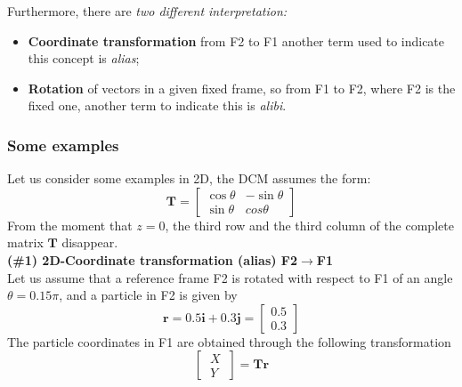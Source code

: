 Furthermore, there are \textit{two different interpretation:}
\begin{itemize}
    \itemsep0em
    \item \textbf{Coordinate transformation} from F2 to F1 another term used to indicate this concept is \textit{alias}; 
    \item \textbf{Rotation} of vectors in a given fixed frame, so from F1 to F2, where F2 is the fixed one, another term to indicate this is \textit{alibi}.
\end{itemize}

\subsubsection*{\color{red} Some examples}
Let us consider some examples in 2D, the DCM assumes the form:
\begin{equation*}
    \mathbf{T} = \begin{bmatrix}
        \cos\theta&-\sin\theta\\
        \sin\theta&cos\theta
    \end{bmatrix}
\end{equation*}
From the moment that $z=0$, the third row and the third column of the complete matrix $\mathbf{T}$ disappear.\\

\noindent
{\color{blue} 
\textbf{(\#1) 2D-Coordinate transformation (alias) F2$\to$F1}
}\\
Let us assume that a reference frame F2 is rotated with respect to F1 of an angle $\theta=0.15\pi$, and a particle in F2 is given by
\begin{equation*}
    \mathbf{r} = 0.5\mathbf{i}+0.3\mathbf{j} =
    \begin{bmatrix}
        0.5\\0.3
    \end{bmatrix}
\end{equation*}
The particle coordinates in F1 are obtained through the following transformation
\begin{equation*}
    \begin{bmatrix}
        \ X \ \\ \ Y \
    \end{bmatrix} = \mathbf{Tr} 
\end{equation*}

